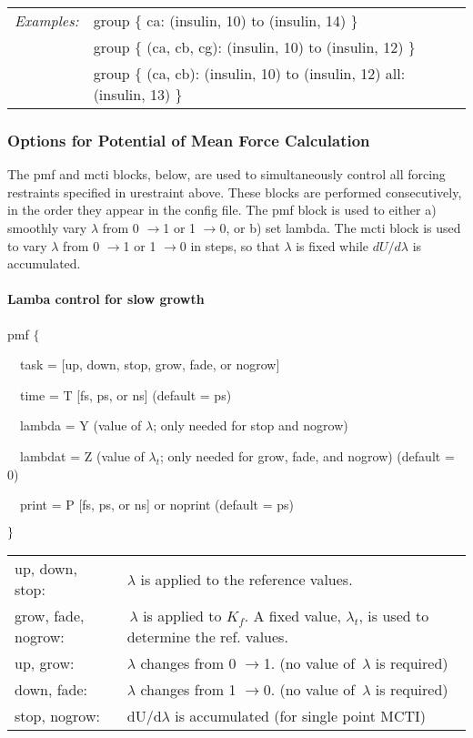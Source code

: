 \begin{tabular}{ll}
{\em Examples:} & group $\{$ ca: (insulin, 10) to (insulin, 14) $\}$ \\ 
& group $\{$ (ca, cb, cg): (insulin, 10) to (insulin, 12) $\}$ \\ 
& group $\{$ (ca, cb): (insulin, 10) to (insulin, 12) all: (insulin, 13) $\}$
\pagebreak 
\end{tabular}
\pagebreak 

\subsubsection{Options for Potential of Mean Force Calculation}

The pmf and mcti blocks, below, are used to simultaneously control all
forcing restraints specified in urestraint above. These blocks are performed
consecutively, in the order they appear in the config file. The pmf block is
used to either a) smoothly vary $\lambda $ from 0 $\rightarrow $1 or 1 $%
\rightarrow $0, or b) set lambda. The mcti block is used to vary $\lambda $
from 0 $\rightarrow $1 or 1 $\rightarrow $0 in steps, so that $\lambda $ is
fixed while $dU/d\lambda $ is accumulated.\medskip

\paragraph*{Lamba control for slow growth}

pmf $\{$

~~task = [up, down, stop, grow, fade, or nogrow]

~~time = T [fs, ps, or ns] (default = ps)

~~lambda = Y (value of $\lambda $; only needed for stop and nogrow)

~~lambdat = Z (value of $\lambda _{t}$; only needed for grow, fade, and
nogrow) (default = 0)

~~print = P [fs, ps, or ns] or noprint (default = ps)

$\}\medskip $

\begin{tabular}{ll}
up, down, stop: & $\lambda $ is applied to the reference values. \\ 
grow, fade, nogrow: & $\,\lambda $ is applied to $K_{f}$. A fixed value, $%
\lambda _{t}$, is used to determine the ref. values. \\ 
up, grow: & $\lambda $ changes from 0 $\rightarrow $1. (no value of $
\,\lambda $ is required) \\ 
down, fade: & $\lambda $ changes from 1 $\rightarrow $0. (no value of $%
\,\lambda $ is required) \\ 
stop, nogrow: & dU/d$\lambda $ is accumulated (for single point
MCTI)\medskip \smallskip
\end{tabular}
\bigskip

